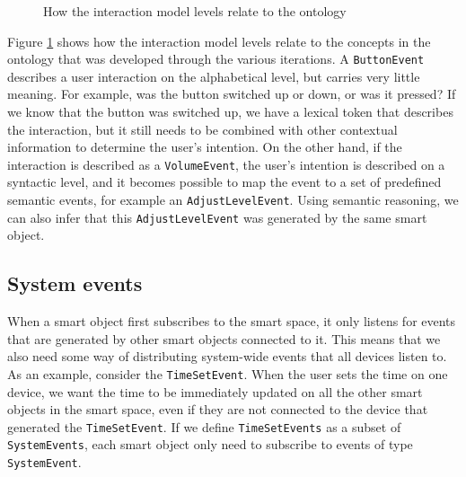 \begin{figure}[bth]
	\caption{How the interaction model levels relate to the ontology}
	\label{InteractionModelToOntology}        
\end{figure}

Figure \ref{InteractionModelToOntology} shows how the interaction model levels relate to the concepts in the ontology that was developed through the various iterations. A \texttt{ButtonEvent} describes a user interaction on the alphabetical level, but carries very little meaning. For example, was the button switched up or down, or was it pressed? If we know that the button was switched up, we have a lexical token that describes the interaction, but it still needs to be combined with other contextual information to determine the user's intention. On the other hand, if the interaction is described as a \texttt{VolumeEvent}, the user's intention is described on a syntactic level, and it becomes possible to map the event to a set of predefined semantic events, for example an \texttt{AdjustLevelEvent}. Using semantic reasoning, we can also infer that this \texttt{AdjustLevelEvent} was generated by the same smart object.




\subsection{System events}
\label{SystemEvents}
When a smart object first subscribes to the smart space, it only listens for events that are generated by other smart objects connected to it. This means that we also need some way of distributing system-wide events that all devices listen to. As an example, consider the \texttt{TimeSetEvent}. When the user sets the time on one device, we want the time to be immediately updated on all the other smart objects in the smart space, even if they are not connected to the device that generated the \texttt{TimeSetEvent}. If we define \texttt{TimeSetEvents} as a subset of \texttt{SystemEvents}, each smart object only need to subscribe to events of type \texttt{SystemEvent}.


